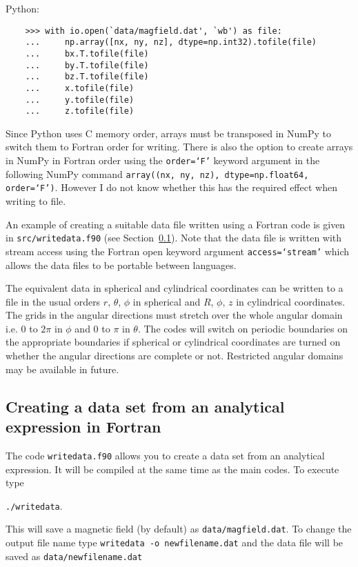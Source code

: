\documentclass[12pt]{article}
\begin{document}
    Python:

    \begin{verbatim}
    >>> with io.open(`data/magfield.dat', `wb') as file:
    ...     np.array([nx, ny, nz], dtype=np.int32).tofile(file)
    ...     bx.T.tofile(file)
    ...     by.T.tofile(file)
    ...     bz.T.tofile(file)
    ...     x.tofile(file)
    ...     y.tofile(file)
    ...     z.tofile(file)
    \end{verbatim}

    Since Python uses C memory order, arrays must be transposed in NumPy to switch them to Fortran order for writing. There is also the option to create arrays in NumPy in Fortran order using the \texttt{order=`F'} keyword argument in the following NumPy command \texttt{array((nx, ny, nz), dtype=np.float64, order=`F')}. However I do not know whether this has the required effect when writing to file.

    An example of creating a suitable data file written using a Fortran code is given in \texttt{src/writedata.f90} (see Section~\ref{sec:writedata}). Note that the data file is written with stream access using the Fortran open keyword argument \texttt{access=`stream'} which allows the data files to be portable between languages.

    The equivalent data in spherical and cylindrical coordinates can be written to a file in the usual orders \( r \), \( \theta \), \( \phi \) in spherical and \( R \), \( \phi \), \( z \) in cylindrical coordinates. The grids in the angular directions must stretch over the whole angular domain i.e. \( 0 \) to \( 2\pi \) in \( \phi \) and \( 0 \) to \( \pi \) in \( \theta \). The codes will switch on periodic boundaries on the appropriate boundaries if spherical or cylindrical coordinates are turned on whether the angular directions are complete or not. Restricted angular domains may be available in future.

    \subsection{Creating a data set from an analytical expression in Fortran}
      \label{sec:writedata}

      The code \texttt{writedata.f90} allows you to create a data set from an analytical expression. It will be compiled at the same time as the main codes. To execute type

      \texttt{./writedata}.

      This will save a magnetic field (by default) as \texttt{data/magfield.dat}. To change the output file name type \texttt{writedata -o newfilename.dat} and the data file will be saved as \texttt{data/newfilename.dat}
\end{document}
